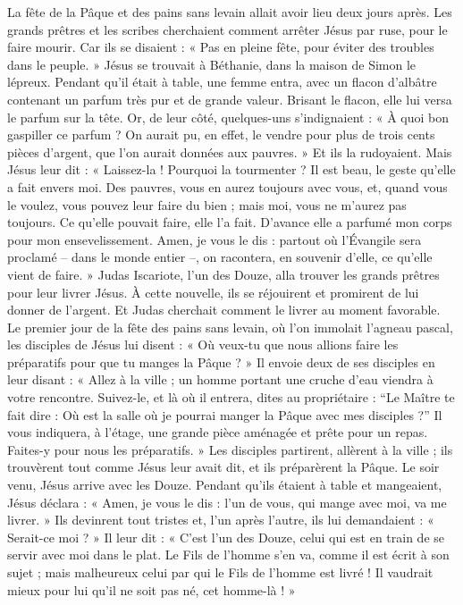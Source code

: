 La fête de la Pâque et des pains sans levain allait avoir lieu deux jours après. Les grands prêtres et les scribes cherchaient comment arrêter Jésus par ruse, pour le faire mourir.
Car ils se disaient : « Pas en pleine fête, pour éviter des troubles dans le peuple. »
Jésus se trouvait à Béthanie, dans la maison de Simon le lépreux. Pendant qu’il était à table, une femme entra, avec un flacon d’albâtre contenant un parfum très pur et de grande valeur. Brisant le flacon, elle lui versa le parfum sur la tête.
Or, de leur côté, quelques-uns s’indignaient : « À quoi bon gaspiller ce parfum ?
On aurait pu, en effet, le vendre pour plus de trois cents pièces d’argent, que l’on aurait données aux pauvres. » Et ils la rudoyaient.
Mais Jésus leur dit : « Laissez-la ! Pourquoi la tourmenter ? Il est beau, le geste qu’elle a fait envers moi.
Des pauvres, vous en aurez toujours avec vous, et, quand vous le voulez, vous pouvez leur faire du bien ; mais moi, vous ne m’aurez pas toujours.
Ce qu’elle pouvait faire, elle l’a fait. D’avance elle a parfumé mon corps pour mon ensevelissement.
Amen, je vous le dis : partout où l’Évangile sera proclamé – dans le monde entier –, on racontera, en souvenir d’elle, ce qu’elle vient de faire. »
Judas Iscariote, l’un des Douze, alla trouver les grands prêtres pour leur livrer Jésus.
À cette nouvelle, ils se réjouirent et promirent de lui donner de l’argent. Et Judas cherchait comment le livrer au moment favorable.
Le premier jour de la fête des pains sans levain, où l’on immolait l’agneau pascal, les disciples de Jésus lui disent : « Où veux-tu que nous allions faire les préparatifs pour que tu manges la Pâque ? »
Il envoie deux de ses disciples en leur disant : « Allez à la ville ; un homme portant une cruche d’eau viendra à votre rencontre. Suivez-le,
et là où il entrera, dites au propriétaire : “Le Maître te fait dire : Où est la salle où je pourrai manger la Pâque avec mes disciples ?”
Il vous indiquera, à l’étage, une grande pièce aménagée et prête pour un repas. Faites-y pour nous les préparatifs. »
Les disciples partirent, allèrent à la ville ; ils trouvèrent tout comme Jésus leur avait dit, et ils préparèrent la Pâque.
Le soir venu, Jésus arrive avec les Douze.
Pendant qu’ils étaient à table et mangeaient, Jésus déclara : « Amen, je vous le dis : l’un de vous, qui mange avec moi, va me livrer. »
Ils devinrent tout tristes et, l’un après l’autre, ils lui demandaient : « Serait-ce moi ? »
Il leur dit : « C’est l’un des Douze, celui qui est en train de se servir avec moi dans le plat.
Le Fils de l’homme s’en va, comme il est écrit à son sujet ; mais malheureux celui par qui le Fils de l’homme est livré ! Il vaudrait mieux pour lui qu’il ne soit pas né, cet homme-là ! »
